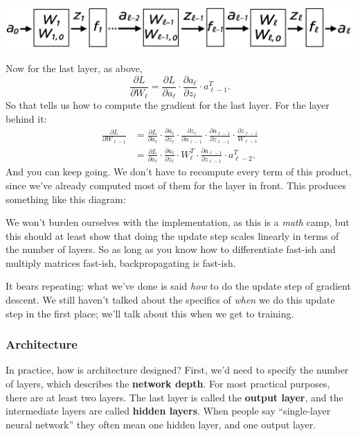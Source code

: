 \documentclass[11pt,paper=letter]{scrartcl}
\begin{document}
\begin{center}
  \includegraphics[width=\textwidth]{28.png}
\end{center}

Now for the last layer, as above, \[
  \frac{\partial L}{\partial W_\ell} = \frac{\partial L}{\partial a_\ell} \cdot \frac{\partial a_\ell}{\partial z_\ell} \cdot a_{\ell - 1}^T.
\]
So that tells us how to compute the gradient for the last layer. For the layer behind it:
\begin{align*}
\frac{\partial L}{\partial W_{\ell - 1}}
&= \frac{\partial L}{\partial a_\ell} \cdot \frac{\partial a_\ell}{\partial z_\ell} \cdot \frac{\partial z_\ell}{\partial a_{\ell - 1}} \cdot \frac{\partial a_{\ell - 1}}{\partial z_{\ell - 1}} \cdot \frac{\partial z_{\ell - 1}}{W_{\ell - 1}} \\
&= \frac{\partial L}{\partial a_\ell} \cdot \frac{\partial a_\ell}{\partial z_\ell} \cdot W_\ell^T \cdot \frac{\partial a_{\ell - 1}}{\partial z_{\ell - 1}} \cdot a_{\ell - 2}^T.
\end{align*}
And you can keep going. We don't have to recompute every term of this product, since we've already computed most of them for the layer in front. This produces something like this diagram:

We won't burden ourselves with the implementation, as this is a \textit{math} camp, but this should at least show that doing the update step scales linearly in terms of the number of layers. So as long as you know how to differentiate fast-ish and multiply matrices fast-ish, backpropagating is fast-ish.

It bears repeating: what we've done is said \textit{how} to do the update step of gradient descent. We still haven't talked about the specifics of \textit{when} we do this update step in the first place; we'll talk about this when we get to training.

\subsubsection*{Architecture}

In practice, how is architecture designed? First, we'd need to specify the number of layers, which describes the \textbf{network depth}. For most practical purposes, there are at least two layers. The last layer is called the \textbf{output layer}, and the intermediate layers are called \textbf{hidden layers}. When people say ``single-layer neural network'' they often mean one hidden layer, and one output layer.
\end{document}

